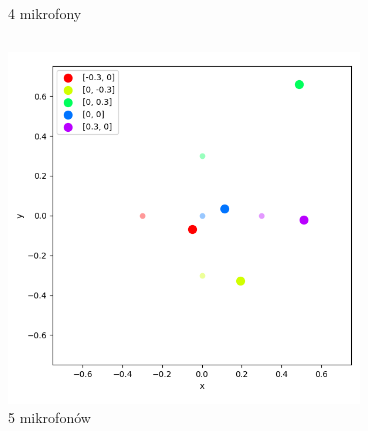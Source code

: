 \begin{frame}{}
\begin{columns}
\begin{column}{0.5\textwidth}
\begin{figure}
                \caption{4 mikrofony}
            \end{figure}
        \end{column}
    \end{columns}
\end{frame}

\begin{frame}{}
    \begin{columns}
        \begin{column}{0.5\textwidth}
            \begin{figure}
                \centering
                \includegraphics[width=\textwidth]{../pics/mult_lat_2d_num/positions_5_mean.png}
                \caption{5 mikrofonów}
            \end{figure}
        \end{column}
        \begin{column}{0.5\textwidth}
            \begin{figure}
                \centering

\end{figure}
\end{column}
\end{columns}
\end{frame}
